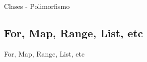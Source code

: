 			\begin{frame}[fragile]{Clases - Polimorfismo}	
				
			\end{frame}
			
	\subsection{For, Map, Range, List, etc} %
	
		\begin{frame}[fragile]{For, Map, Range, List, etc}	
			
		\end{frame}
